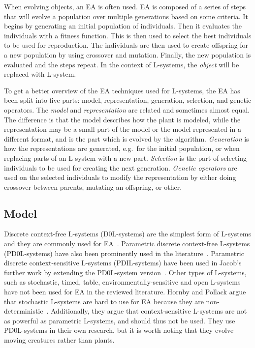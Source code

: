 When evolving objects, an \gls{EA} is often used.
\gls{EA} is composed of a series of steps that will evolve a population over multiple generations based on some criteria.
It begins by generating an initial population of individuals.
Then it evaluates the individuals with a fitness function.
This is then used to select the best individuals to be used for reproduction.
The individuals are then used to create offspring for a new population by using crossover and mutation.
Finally, the new population is evaluated and the steps repeat.
In the context of \glspl{L-system}, the \textit{object} will be replaced with \gls{L-system}.

To get a better overview of the \gls{EA} techniques used for \glspl{L-system}, the \gls{EA} has been split into five parts: model, representation, generation, selection, and genetic operators.
The \textit{model} and \textit{representation} are related and sometimes almost equal.
The difference is that the model describes how the plant is modeled, while the representation may be a small part of the model or the model represented in a different format, and is the part which is evolved by the algorithm.
\textit{Generation} is how the representations are generated, e.g.\ for the initial population, or when replacing parts of an \gls{L-system} with a new part.
\textit{Selection} is the part of selecting individuals to be used for creating the next generation.
\textit{Genetic operators} are used on the selected individuals to modify the representation by either doing crossover between parents, mutating an offspring, or other.

\subsection{Model}
Discrete context-free \glspl{L-system} (D0L-systems) are the simplest form of \glspl{L-system} and they are commonly used for \gls{EA}~\cite{1998Mock,1998Ochoa,2002Ebner,2003Ebner,2006Ashlock,2009Beaumont,2009Corchado}.
Parametric discrete context-free \glspl{L-system} (PD0L-systems) have also been prominently used in the literature~\cite{1994Jacob,2000Vanak,2001Hornby}.
Parametric discrete context-sensitive \glspl{L-system} (PDIL-systems) have been used in Jacob's further work by extending the PD0L-system version~\cite{1995Jacob, 1996Jacob, 1996Jacob-2}.
Other types of \glspl{L-system}, such as stochastic, timed, table, environmentally-sensitive and open \glspl{L-system} have not been used for \gls{EA} in the reviewed literature.
Hornby and Pollack argue that stochastic \glspl{L-system} are hard to use for \gls{EA} because they are non-deterministic~\cite{2001Hornby}.
Additionally, they argue that context-sensitive \glspl{L-system} are not as powerful as parametric \glspl{L-system}, and should thus not be used.
They use PD0L-systems in their own research, but it is worth noting that they evolve moving creatures rather than plants.

